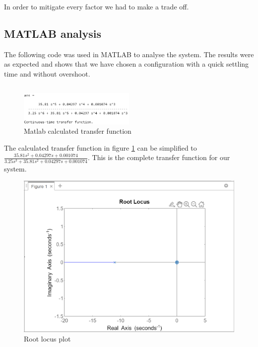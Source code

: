 In order to mitigate every factor we had to make a trade off. 

\subsection{MATLAB analysis}

The following code was used in MATLAB to analyse the system. The results were as expected and shows that we have chosen a configuration with a quick settling time and without overshoot.


\inputminted[breaklines]{Matlab}{./Code/PID-Matlab.m}


\begin{figure}[h]
    \centering
    \includegraphics[width = 0.5\textwidth]{Code/Images/Tf.png}
    \caption{Matlab calculated transfer function}
    \label{fig:Matlab calculated transfer function}
\end{figure}

The calculated transfer function in figure \ref{fig:Matlab calculated transfer function} can be simplified to $\frac{35.81s^2+0.04297s+0.001074}{3.25s^3+35.81s^2+0.04297s+0.001074}$. This is the complete transfer function for our system.

\begin{figure}[h]
    \centering
    \includegraphics[width = 1\textwidth]{Code/Images/root-locus.png}
    \caption{Root locus plot}
    \label{fig:Root locus plot}
\end{figure}

